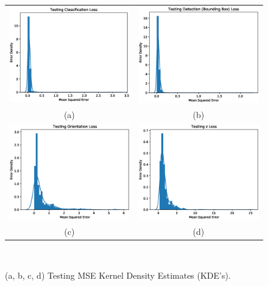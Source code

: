 \begin{figure}[!htbp]
  \centering
  \begin{tabular}{cc}
    \includegraphics[width=.4\linewidth]{figures/spp/quant/density/classification_loss_test.eps}&
		\includegraphics[width=.4\linewidth]{figures/spp/quant/density/detection_loss_test.eps}\\
    (a) & (b) \\
    \includegraphics[width=.4\linewidth]{figures/spp/quant/density/orientation_loss_test.eps}&
		\includegraphics[width=.4\linewidth]{figures/spp/quant/density/z_loss_test.eps}\\
    (c) & (d)
  \end{tabular}
  \caption[GP Shape Draws]
  {
    (a, b, c, d) Testing MSE Kernel Density Estimates (KDE's).
  }
~\label{figure:spp_quant_density_test}
\end{figure}

